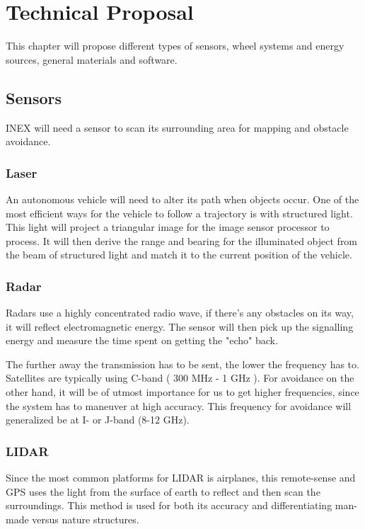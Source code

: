 \chapter{Technical Proposal}\label{ch:solutionProposal}
This chapter will propose different types of sensors, wheel systems and energy sources, general materials and software.

\section{Sensors}
INEX will need a sensor to scan its surrounding area for mapping and obstacle avoidance.

\subsection{Laser}
An autonomous vehicle will need to alter its path when objects occur. One of the most efficient ways for the vehicle to follow a trajectory is with structured light.\\This light will project a triangular image for the image sensor processor to process. It will then derive the range and bearing for the illuminated object from the beam of structured light and match it to the current position of the vehicle\cite{Lasers}.


\subsection{Radar}
Radars use a highly concentrated radio wave, if there's any obstacles on its way, it will reflect electromagnetic energy. The sensor will then pick up the signalling energy and measure the time spent on getting the "echo" back\cite{Radar}.

The further away the transmission has to be sent, the lower the frequency has to.
Satellites are typically using C-band ( 300 MHz - 1 GHz ). 
For avoidance on the other hand, it will be of utmost importance for us to get higher frequencies, since the system has to maneuver at high accuracy. This frequency for avoidance will generalized be at I- or J-band (8-12 GHz)\cite{RadarTutorial}.



\subsection{LIDAR}
Since the most common platforms for LIDAR is airplanes, this remote-sense and GPS uses the light from the surface of earth to reflect and then scan the surroundings. This method is used for both its accuracy and differentiating man-made versus nature structures\cite{LIDAR}.

